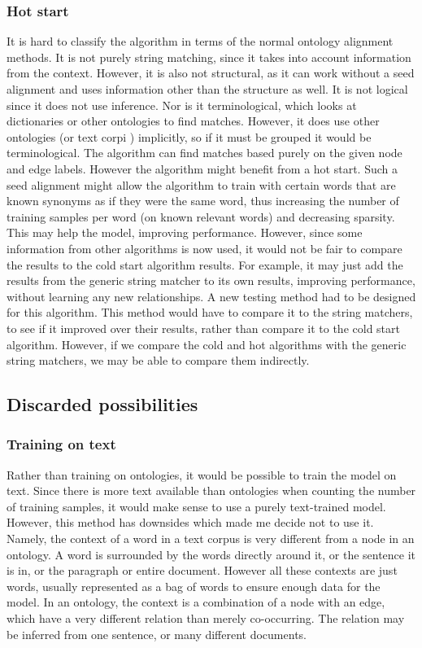 \documentclass{article}
\begin{document}
  \subsubsection{Hot start}
  It is hard to classify the algorithm in terms of the normal ontology alignment methods. It is not purely string matching, since it takes into account information from the context. However, it is also not structural, as it can work without a seed alignment and uses information other than the structure as well. It is not logical 
  since it does not use inference. Nor is it terminological, which looks at dictionaries or other ontologies to find matches. However, it does use other ontologies (or text corpi
  ) implicitly, so if it must be grouped it would be terminological.
  The algorithm can find matches based purely on the given node and edge labels. However the algorithm might benefit from a hot start. Such a seed alignment might allow the algorithm to train with certain words that are known synonyms as if they were the same word, thus increasing the number of training samples per word (on known relevant words) and decreasing sparsity. This may help the model, improving performance. However, since some information from other algorithms is now used, it would not be fair to compare the results to the cold start algorithm results. For example, it may just add the results from the generic string matcher to its own results, improving performance, without learning any new relationships. A new testing method had to be designed for this algorithm. This method would have to compare it to the string matchers, to see if it improved over their results, rather than compare it to the cold start algorithm. However, if we compare the cold and hot algorithms with the generic string matchers, we may be able to compare them indirectly. 
 \subsection{Discarded possibilities} %
  \subsubsection{Training on text}
  Rather than training on ontologies, it would be possible to train the model on text. Since there is more text available than ontologies when counting the number of training samples, it would make sense to use a purely text-trained model. However, this method has downsides which made me decide not to use it. Namely, the context of a word in a text corpus is very different from a node in an ontology. A word is surrounded by the words directly around it, or the sentence it is in, or the paragraph or entire document. However all these contexts are just words, usually represented as a bag of words to ensure enough data for the model. In an ontology, the context is a combination of a node with an edge, which have a very different relation than merely co-occurring. The relation may be inferred from one sentence, or many different documents.
\end{document}
